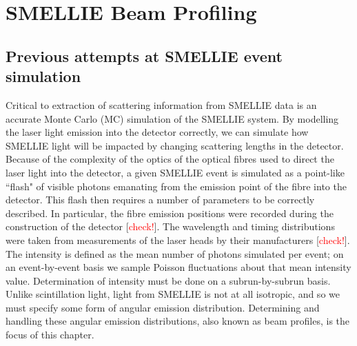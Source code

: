 \section{SMELLIE Beam Profiling}\label{sect:beam_profiling}
\subsection{Previous attempts at SMELLIE event simulation}
Critical to extraction of scattering information from SMELLIE data is an accurate Monte Carlo (MC) simulation of the SMELLIE system. By modelling the laser light emission into the detector correctly, we can simulate how SMELLIE light will be impacted by changing scattering lengths in the detector. Because of the complexity of the optics of the optical fibres used to direct the laser light into the detector, a given SMELLIE event is simulated as a point-like ``flash" of visible photons emanating from the emission point of the fibre into the detector. This flash then requires a number of parameters to be correctly described. In particular, the fibre emission positions were recorded during the construction of the detector [\textcolor{red}{check!}]. The wavelength and timing distributions were taken from measurements of the laser heads by their manufacturers [\textcolor{red}{check!}]. The intensity is defined as the mean number of photons simulated per event; on an event-by-event basis we sample Poisson fluctuations about that mean intensity value. Determination of intensity must be done on a subrun-by-subrun basis. Unlike scintillation light, light from SMELLIE is not at all isotropic, and so we must specify some form of angular emission distribution. Determining and handling these angular emission distributions, also known as beam profiles, is the focus of this chapter.

